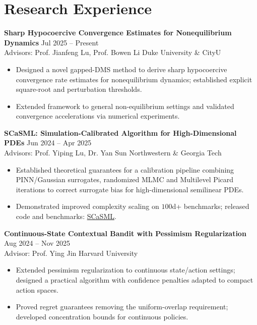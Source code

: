 \documentclass[11pt]{article}
\newlength{\cvitemsep}     \setlength{\cvitemsep}{3pt}  %
\newlength{\projsep}      \setlength{\projsep}{\dimexpr 3\cvitemsep\relax} %
\begin{document}
\section{Research Experience}

\noindent\textbf{Sharp Hypocoercive Convergence Estimates for Nonequilibrium Dynamics} \hfill Jul 2025 -- Present \\
Advisors: Prof. Jianfeng Lu, Prof. Bowen Li \hfill Duke University \& CityU
\begin{itemize}
  \item Designed a novel gapped-DMS method to derive sharp hypocoercive convergence rate estimates for nonequilibrium dynamics; established explicit square-root and perturbation thresholds.
  \item Extended framework to general non-equilibrium settings and validated convergence accelerations via numerical experiments.
\end{itemize}
\vspace{\projsep}

\noindent\textbf{SCaSML: Simulation-Calibrated Algorithm for High-Dimensional PDEs} \hfill Jun 2024 -- Apr 2025 \\
Advisors: Prof. Yiping Lu, Dr. Yan Sun \hfill Northwestern \& Georgia Tech
\begin{itemize}
  \item Established theoretical guarantees for a calibration pipeline combining PINN/Gaussian surrogates, randomized MLMC and Multilevel Picard iterations to correct surrogate bias for high-dimensional semilinear PDEs.
  \item Demonstrated improved complexity scaling on $100$d+ benchmarks; released code and benchmarks: \href{https://github.com/Francis-Fan-create/SCaSML.git}{SCaSML}.
\end{itemize}
\vspace{\projsep}

\noindent\textbf{Continuous-State Contextual Bandit with Pessimism Regularization} \hfill Aug 2024 -- Nov 2025 \\
Advisor: Prof. Ying Jin \hfill Harvard University
\begin{itemize}
  \item Extended pessimism regularization to continuous state/action settings; designed a practical algorithm with confidence penalties adapted to compact action spaces.
  \item Proved regret guarantees removing the uniform-overlap requirement; developed concentration bounds for continuous policies.
\end{itemize}
\vspace{\projsep}
\end{document}
